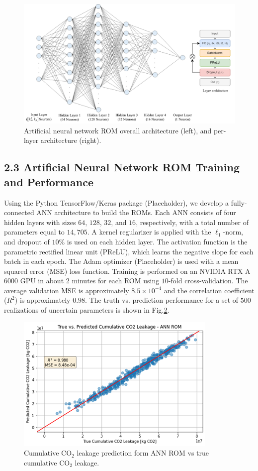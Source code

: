 \documentclass[10pt, twoside]{article}
\begin{document}
\begin{figure} [H]
\centering
\includegraphics[width=16 cm]{Figure 2.png}
\caption{Artificial neural network ROM overall architecture (left), and per-layer architecture (right).}
\label{ann_arch}
\end{figure}

\subsection*{2.3 Artificial Neural Network ROM Training and Performance}
Using the Python TensorFlow/Keras package (Placeholder), we develop a fully-connected ANN architecture to build the ROMs. Each ANN consists of four hidden layers with sizes $64$, $128$, $32$, and $16$, respectively, with a total number of parameters equal to $14,705$. A kernel regularizer is applied with the $\ell_1$-norm, and dropout of $10\%$ is used on each hidden layer. The activation function is the parametric rectified linear unit (PReLU), which learns the negative slope for each batch in each epoch. The Adam optimizer (Placeholder) is used with a mean squared error (MSE) loss function. Training is performed on an NVIDIA RTX A$6000$ GPU in about $2$ minutes for each ROM using $10$-fold cross-validation. The average validation MSE is approximately $8.5\times10^{-4}$ and the correlation coefficient ($R^2$) is approximately $0.98$. The truth vs. prediction performance for a set of $500$ realizations of uncertain parameters is shown in Fig.\ref{rom_train}.

\begin{figure} [H]
\centering
\includegraphics[width=10 cm]{Figure 3.png}
\caption{Cumulative CO$_2$ leakage prediction form ANN ROM vs true cumulative CO$_2$ leakage.}
\label{rom_train}
\end{figure}
\end{document}
